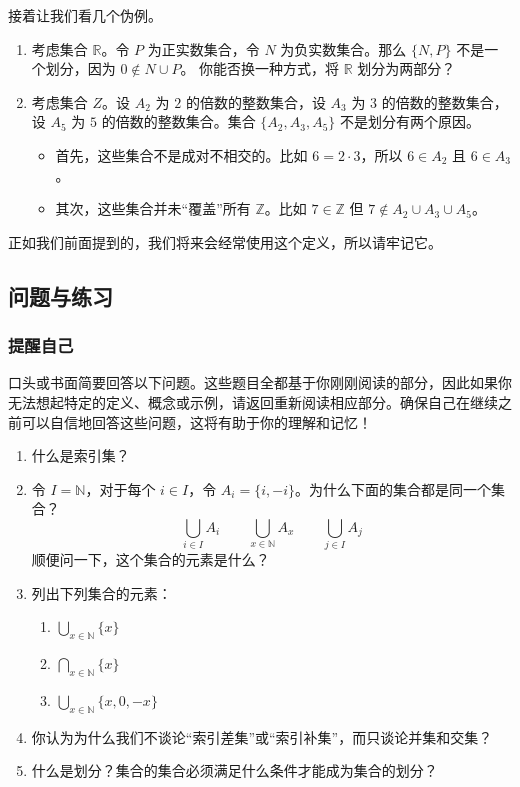 \begin{example}
    接着让我们看几个伪例。
    \begin{enumerate}[label=(\arabic*)]
        \item 考虑集合 $\mathbb{R}$。令 $P$ 为正实数集合，令 $N$ 为负实数集合。那么 $\{N, P\}$ 不是一个划分，因为 $0 \notin N \cup P$。
        你能否换一种方式，将 $\mathbb{R}$ 划分为两部分？
        \item 考虑集合 $Z$。设 $A_2$ 为 $2$ 的倍数的整数集合，设 $A_3$ 为 $3$ 的倍数的整数集合，设 $A_5$ 为 $5$ 的倍数的整数集合。集合 $\{A_2, A_3, A_5\}$ 不是划分有两个原因。
        \begin{itemize}
            \item 首先，这些集合不是成对不相交的。比如 $6=2 \cdot 3$，所以 $6 \in A_2$ 且 $6 \in A_3$。
            \item 其次，这些集合并未``覆盖''所有 $\mathbb{Z}$。比如 $7 \in \mathbb{Z}$ 但 $7 \notin A_2 \cup A_3 \cup A_5$。
        \end{itemize}
    \end{enumerate}
\end{example}

正如我们前面提到的，我们将来会经常使用这个定义，所以请牢记它。

\subsection{问题与练习}

\subsubsection*{提醒自己}

口头或书面简要回答以下问题。这些题目全都基于你刚刚阅读的部分，因此如果你无法想起特定的定义、概念或示例，请返回重新阅读相应部分。确保自己在继续之前可以自信地回答这些问题，这将有助于你的理解和记忆！

\begin{enumerate}[label=(\arabic*)]
    \item 什么是索引集？
    \item 令 $I = \mathbb{N}$，对于每个 $i \in I$，令 $A_i = \{i, -i\}$。为什么下面的集合都是同一个集合？
    \[\bigcup_{i \in I} A_i \qquad \bigcup_{x \in \mathbb{N}} A_x \qquad \bigcup_{j \in I} A_j\]
    顺便问一下，这个集合的元素是什么？
    \item 列出下列集合的元素：
    \begin{enumerate}[label=(\alph*)]
        \item $\displaystyle{\bigcup_{x \in \mathbb{N}}\{x\}}$
        \item $\displaystyle{\bigcap_{x \in \mathbb{N}}\{x\}}$
        \item $\displaystyle{\bigcup_{x \in \mathbb{N}}\{x,0,-x\}}$
    \end{enumerate}
    \item 你认为为什么我们不谈论``索引差集''或``索引补集''，而只谈论并集和交集？
    \item 什么是划分？集合的集合必须满足什么条件才能成为集合的划分？
\end{enumerate}

